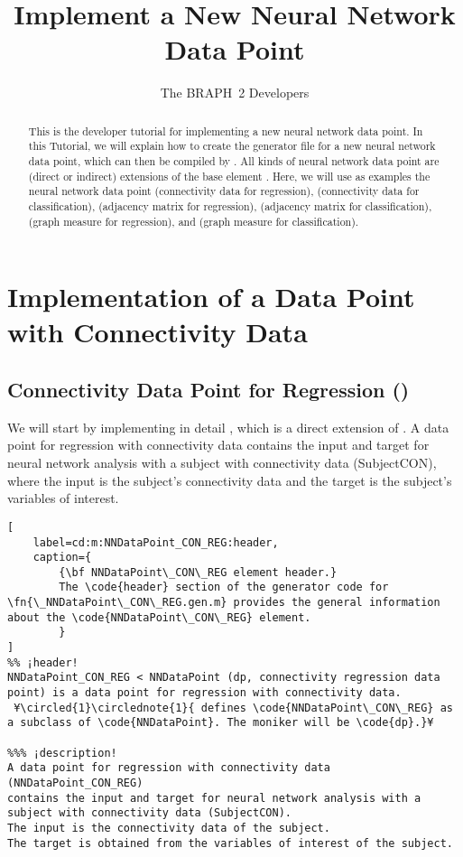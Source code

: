 \documentclass{tufte-handout}
\title{Implement a New Neural Network Data Point}
\author[The BRAPH~2 Developers]{The BRAPH~2 Developers}
\begin{document}
\maketitle

\begin{abstract}
\noindent
This is the developer tutorial for implementing a new neural network data point. 
In this Tutorial, we will explain how to create the generator file  for a new neural network data point, which can then be compiled by . All kinds of neural network data point are (direct or indirect) extensions of the base element . Here, we will use as examples the neural network data point  (connectivity data for regression),  (connectivity data for classification),  (adjacency matrix for regression),  (adjacency matrix for classification),  (graph measure for regression), and  (graph measure for classification).
\end{abstract}

\tableofcontents

\clearpage
\section{Implementation of a Data Point with Connectivity Data}

\subsection{Connectivity Data Point for Regression ()}

We will start by implementing in detail , which is a direct extension of .
A data point for regression with connectivity data  contains the input and target for neural network analysis with a subject with connectivity data (SubjectCON), where the input is the subject's connectivity data and the target is the subject's variables of interest.

\begin{lstlisting}[
	label=cd:m:NNDataPoint_CON_REG:header,
	caption={
		{\bf NNDataPoint\_CON\_REG element header.}
		The \code{header} section of the generator code for \fn{\_NNDataPoint\_CON\_REG.gen.m} provides the general information about the \code{NNDataPoint\_CON\_REG} element.
		}
]
%% ¡header!
NNDataPoint_CON_REG < NNDataPoint (dp, connectivity regression data point) is a data point for regression with connectivity data.
 ¥\circled{1}\circlednote{1}{ defines \code{NNDataPoint\_CON\_REG} as a subclass of \code{NNDataPoint}. The moniker will be \code{dp}.}¥

%%% ¡description!
A data point for regression with connectivity data (NNDataPoint_CON_REG) 
contains the input and target for neural network analysis with a subject with connectivity data (SubjectCON).
The input is the connectivity data of the subject.
The target is obtained from the variables of interest of the subject.
\end{lstlisting}
\end{document}

